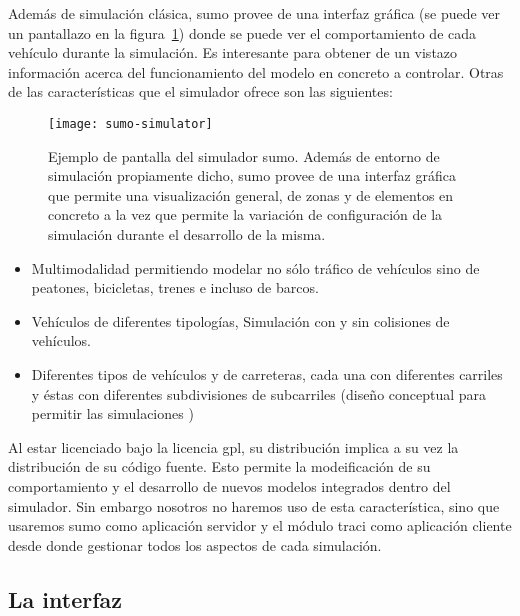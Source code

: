 Además de simulación clásica, \gls{sumo} provee de una interfaz gráfica (se puede ver un pantallazo en la figura~\ref{fig:sumo-simulator}) donde se puede ver el comportamiento de cada vehículo durante la simulación. Es interesante para obtener de un vistazo información acerca del funcionamiento del modelo en concreto a controlar. Otras de las características que el simulador ofrece son las siguientes:

\begin{figure}
	\texttt{[image: sumo-simulator]}
	\caption{Ejemplo de pantalla del simulador \gls{sumo}. Además de entorno de simulación propiamente dicho, \gls{sumo} provee de una interfaz gráfica que permite una visualización general, de zonas y de elementos en concreto a la vez que permite la variación de configuración de la simulación durante el desarrollo de la misma.}
	\label{fig:sumo-simulator}
\end{figure}

\begin{itemize}
	\item Multimodalidad permitiendo modelar no sólo tráfico de vehículos sino de peatones, bicicletas, trenes e incluso de barcos.
	\item Vehículos de diferentes tipologías, Simulación con y sin colisiones de vehículos.
	\item Diferentes tipos de vehículos y de carreteras, cada una con diferentes carriles y éstas con diferentes subdivisiones de subcarriles (diseño conceptual para permitir las simulaciones )
\end{itemize}

Al estar licenciado bajo la licencia \gls{gpl}, su distribución implica a su vez la distribución de su código fuente. Esto permite la modeificación de su comportamiento y el desarrollo de nuevos modelos integrados dentro del simulador. Sin embargo nosotros no haremos uso de esta característica, sino que usaremos \gls{sumo} como aplicación servidor y el módulo \gls{traci} como aplicación cliente desde donde gestionar todos los aspectos de cada simulación.

\subsection{La interfaz }